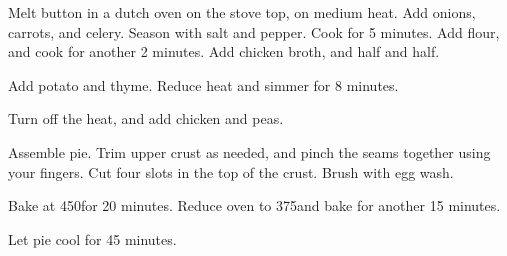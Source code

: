 \begin{recipe}
Melt button in a dutch oven on the stove top, on medium heat. Add onions, 
carrots, and celery. Season with salt and pepper. Cook for 5 minutes. Add
flour, and cook for another 2 minutes. Add chicken broth, and half and half. 

Add potato and thyme. Reduce heat and simmer for 8 minutes. 

Turn off the heat, and add chicken and peas. 

Assemble pie. Trim upper crust as needed, and pinch the seams together using 
your fingers. Cut four slots in the top of the crust. Brush with egg wash.

Bake at 450\degree for 20 minutes. Reduce oven to 375\degree and bake for 
another 15 minutes. 

Let pie cool for 45 minutes. 

\end{recipe}
